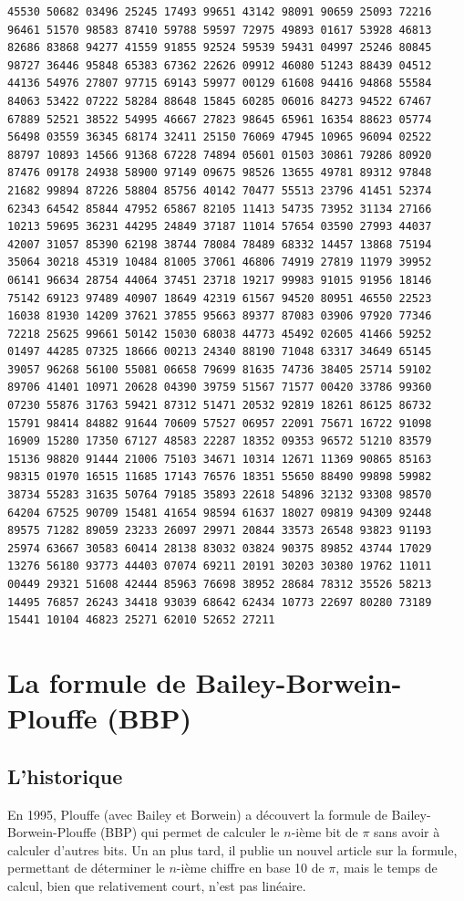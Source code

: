 \documentclass[a4paper,11pt]{book}
\begin{document}
\begin{verbatim}
45530 50682 03496 25245 17493 99651 43142 98091 90659 25093 72216 
96461 51570 98583 87410 59788 59597 72975 49893 01617 53928 46813 
82686 83868 94277 41559 91855 92524 59539 59431 04997 25246 80845 
98727 36446 95848 65383 67362 22626 09912 46080 51243 88439 04512 
44136 54976 27807 97715 69143 59977 00129 61608 94416 94868 55584 
84063 53422 07222 58284 88648 15845 60285 06016 84273 94522 67467 
67889 52521 38522 54995 46667 27823 98645 65961 16354 88623 05774 
56498 03559 36345 68174 32411 25150 76069 47945 10965 96094 02522 
88797 10893 14566 91368 67228 74894 05601 01503 30861 79286 80920 
87476 09178 24938 58900 97149 09675 98526 13655 49781 89312 97848 
21682 99894 87226 58804 85756 40142 70477 55513 23796 41451 52374 
62343 64542 85844 47952 65867 82105 11413 54735 73952 31134 27166 
10213 59695 36231 44295 24849 37187 11014 57654 03590 27993 44037 
42007 31057 85390 62198 38744 78084 78489 68332 14457 13868 75194 
35064 30218 45319 10484 81005 37061 46806 74919 27819 11979 39952 
06141 96634 28754 44064 37451 23718 19217 99983 91015 91956 18146 
75142 69123 97489 40907 18649 42319 61567 94520 80951 46550 22523 
16038 81930 14209 37621 37855 95663 89377 87083 03906 97920 77346 
72218 25625 99661 50142 15030 68038 44773 45492 02605 41466 59252 
01497 44285 07325 18666 00213 24340 88190 71048 63317 34649 65145 
39057 96268 56100 55081 06658 79699 81635 74736 38405 25714 59102 
89706 41401 10971 20628 04390 39759 51567 71577 00420 33786 99360 
07230 55876 31763 59421 87312 51471 20532 92819 18261 86125 86732 
15791 98414 84882 91644 70609 57527 06957 22091 75671 16722 91098 
16909 15280 17350 67127 48583 22287 18352 09353 96572 51210 83579 
15136 98820 91444 21006 75103 34671 10314 12671 11369 90865 85163 
98315 01970 16515 11685 17143 76576 18351 55650 88490 99898 59982 
38734 55283 31635 50764 79185 35893 22618 54896 32132 93308 98570 
64204 67525 90709 15481 41654 98594 61637 18027 09819 94309 92448 
89575 71282 89059 23233 26097 29971 20844 33573 26548 93823 91193 
25974 63667 30583 60414 28138 83032 03824 90375 89852 43744 17029 
13276 56180 93773 44403 07074 69211 20191 30203 30380 19762 11011 
00449 29321 51608 42444 85963 76698 38952 28684 78312 35526 58213 
14495 76857 26243 34418 93039 68642 62434 10773 22697 80280 73189 
15441 10104 46823 25271 62010 52652 27211 
\end{verbatim}
\section{La formule de Bailey-Borwein-Plouffe (BBP)}
\subsection{L'historique}
En 1995, Plouffe (avec Bailey et Borwein) a d\'ecouvert la formule de 
Bailey-Borwein-Plouffe (BBP) qui permet de calculer le $n$-ième bit de $\pi$ 
sans avoir à calculer d'autres bits. Un an
plus tard, il publie un nouvel article sur la formule, permettant de 
d\'eterminer le $n$-ième chiffre en base 10 de $\pi$, mais le temps de calcul, 
bien que relativement court, n'est pas lin\'eaire.
\end{document}

